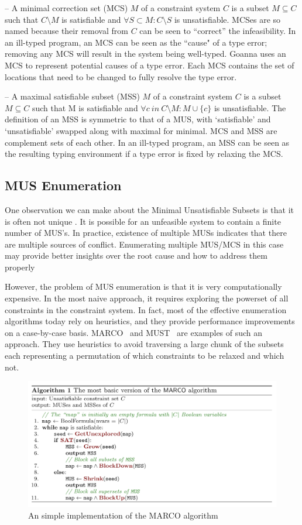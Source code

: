 – A minimal correction set (MCS) $M$ of a constraint system $C$ is a subset $M \subseteq C$ such that $C \setminus M$ is satisfiable and $\forall{S} \subset M : C \setminus S$ is unsatisfiable. MCSes are so named because their removal from $C$ can be seen to “correct” the infeasibility. In an ill-typed program, an MCS can be seen as the ``cause" of a type error; removing any MCS will result in the system being well-typed. Goanna uses an MCS to represent potential causes of a type error. Each MCS contains the set of locations that need to be changed to fully resolve the type error.

  

– A maximal satisfiable subset (MSS) $M$ of a constraint system $C$ is a subset $M \subseteq C$ such that M is satisfiable and $\forall{c}\ in\ C \setminus M:M\cup\{c\}$ is unsatisfiable. The definition of an MSS is symmetric to that of a MUS, with `satisfiable' and `unsatisfiable' swapped along with maximal for minimal. MCS and MSS are complement sets of each other. In an ill-typed program, an MSS can be seen as the resulting typing environment if a type error is fixed by relaxing the MCS.

\subsection{MUS Enumeration}
One observation we can make about the  Minimal Unsatisfiable Subsets is that it is often not unique . It is possible for an unfeasible system to contain a finite number of MUS’s. In practice, existence of multiple MUSs indicates that there are multiple sources of conflict. Enumerating multiple MUS/MCS in this case may provide better insights over the root cause and how to address them properly


However, the problem of MUS enumeration is that it is very computationally expensive. In the most naive approach, it requires exploring the powerset of all constraints in the constraint system. In fact, most of the effective enumeration algorithms today rely on heuristics, and they provide performance improvements on a case-by-case basis. MARCO~\cite{} and MUST~\cite{} are examples of such an approach. They use heuristics to avoid traversing a large chunk of the subsets each representing a permutation of which constraints to be relaxed and which not.


\begin{figure}[hbt]
  \includegraphics[width=\linewidth]{MarcoAlgo}
  \caption{An simple implementation of the MARCO algorithm}
\end{figure}


